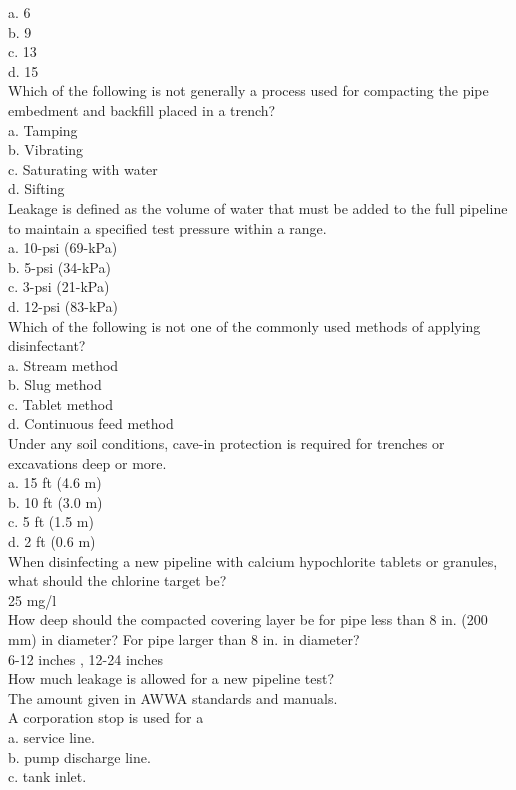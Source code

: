 a.	6\\
b.	9\\
c.	13\\
d.	15\\
Which of the following is not generally a process used for compacting the pipe embedment and backfill placed in a trench?\\
a.	Tamping\\
b.	Vibrating\\
c.	Saturating with water\\
d.	Sifting\\
Leakage is defined as the volume of water that must be added to the full pipeline to maintain a specified test pressure within a	range.\\
a.	10-psi (69-kPa)\\
b.	5-psi (34-kPa)\\
c.	3-psi (21-kPa)\\
d.	12-psi (83-kPa)\\
Which of the following is not one of the commonly used methods of applying disinfectant?\\
a.	Stream method\\
b.	Slug method\\
c.	Tablet method\\
d.	Continuous feed method\\
Under any soil conditions, cave-in protection is required for trenches or excavations	deep or more.\\
a.	15 ft (4.6 m)\\
b.	10 ft (3.0 m)\\
c.	5 ft (1.5 m)\\
d.	2 ft (0.6 m)\\
When disinfecting a new pipeline with calcium hypochlorite tablets or granules, what should the chlorine target be?\\
25 mg/l\\
How deep should the compacted covering layer be for pipe less than 8 in. (200 mm) in diameter? For pipe larger than 8 in.  in diameter?\\
6-12 inches , 12-24 inches \\
How much leakage is allowed for a new pipeline test?\\
The amount given in AWWA standards and manuals.\\
A corporation stop is used for a\\
a.	service line.\\
b.	pump discharge line.\\
c.	tank inlet.\\
